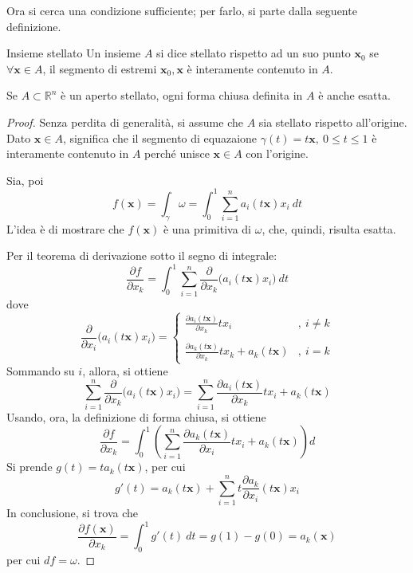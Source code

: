 \documentclass[10pt, a4paper]{scrartcl}
\theoremstyle{definition}
\numberwithin{esempio}{section}
\theoremstyle{definition}
\numberwithin{obs}{section}
\numberwithin{nota}{section}
\numberwithin{equation}{subsection}
\begin{document}
Ora si cerca una condizione sufficiente; per farlo, si parte dalla seguente definizione.
\begin{definizione}
	{Insieme stellato}{}
	Un insieme $A$ si dice stellato rispetto ad un suo punto $\mathbf{x} _0$ se $\forall \mathbf{x} \in A$, il segmento di estremi $\mathbf{x} _0, \mathbf{x} $ \`e interamente contenuto in $A$.
\end{definizione}
\begin{teorema}
	{}{}
	Se $A \subset \mathbb{R}^n$ \`e un aperto stellato, ogni forma chiusa definita in $A$ \`e anche esatta.
	\begin{proof}
		Senza perdita di generalit\`a, si assume che $A$ sia stellato rispetto all'origine.
Dato $\mathbf{x} \in A$, significa che il segmento di equazaione $\gamma(t) = t \mathbf{x} , \ 0\le t \le 1$ \`e interamente contenuto in $A$ perch\'e unisce $\mathbf{x} \in A$ con l'origine.

Sia, poi
\[
f(\mathbf{x} ) = \int_{\gamma} \omega = \int_{0} ^1  \sum_{i=1}^{n} a_i(t\mathbf{x} ) x_i \ dt 
\] 
L'idea \`e di mostrare che $f(\mathbf{x} )$ \`e una primitiva di $\omega$, che, quindi, risulta esatta.

Per il teorema di derivazione sotto il segno di integrale:
\[
\frac{\partial f}{\partial x_k} = \int_{0} ^1 \sum_{i=1}^{n} \frac{\partial }{\partial x_k} \big(a_i(t\mathbf{x} ) x_i\big) \ dt 
\] 
dove 
\[
\frac{\partial }{\partial x_i} \big(a_i(t\mathbf{x} ) x_i\big)= \begin{cases}
	\displaystyle \frac{\partial a_i(t\mathbf{x} )}{\partial x_k} t x_i &,\ i\neq k\\
	\\
	\displaystyle \frac{\partial a_k(t\mathbf{x} )}{\partial x_k} tx_k + a_k(t\mathbf{x} ) &,\ i = k
\end{cases}
\] 
Sommando su $i$, allora, si ottiene
\[
\sum_{i=1}^{n} \frac{\partial }{\partial x_k} \big(a_i(t\mathbf{x} ) x_i\big)= \sum_{i=1}^{n} \frac{\partial a_i(t\mathbf{x} )}{\partial x_k} tx_i +  a_k(t\mathbf{x} )
\] 
Usando, ora, la definizione di forma chiusa, si ottiene
\[
\frac{\partial f}{\partial x_k} = \int_{0} ^1 \left(\sum_{i=1}^{n} \frac{\partial a_k(t\mathbf{x} )}{\partial x_i} tx_i + a_k(t\mathbf{x} )\right)  d 
\] 
Si prende $g(t) = ta_k(t\mathbf{x} )$, per cui
\[
g' (t) = a_k (t\mathbf{x} ) + \sum_{i=1}^{n} t \frac{\partial a_k}{\partial x_i} (t\mathbf{x} ) x_i
\] 
In conclusione, si trova che
\[
\frac{\partial f(\mathbf{x} )}{\partial x_k} = \int_{0} ^1 g'(t) \ dt = g(1) - g(0) = a_k (\mathbf{x} )
\] 
per cui $df = \omega$.
	\end{proof}
\end{teorema}
\end{document}
